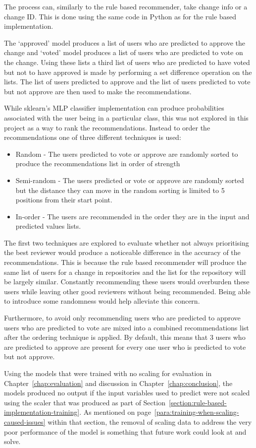 The process can, similarly to the rule based recommender, take change info or a change ID. This is done using the same code in Python as for the rule based implementation.

The `approved' model produces a list of users who are predicted to approve the change and `voted' model produces a list of users who are predicted to vote on the change. Using these lists a third list of users who are predicted to have voted but not to have approved is made by performing a set difference operation on the lists. The list of users predicted to approve and the list of users predicted to vote but not approve are then used to make the recommendations.

While sklearn's MLP classifier implementation can produce probabilities associated with the user being in a particular class, this was not explored in this project as a way to rank the recommendations. \label{para:selection-mode-neural-network}Instead to order the recommendations one of three different techniques is used:
\begin{itemize}
    \item Random - The users predicted to vote or approve are randomly sorted to produce the recommendations list in order of strength
    \item Semi-random - The users predicted or vote or approve are randomly sorted but the distance they can move in the random sorting is limited to 5 positions from their start point.
    \item In-order - The users are recommended in the order they are in the input and predicted values lists.
\end{itemize}

The first two techniques are explored to evaluate whether not always prioritising the best reviewer would produce a noticeable difference in the accuracy of the recommendations. This is because the rule based recommender will produce the same list of users for a change in repositories and the list for the repository will be largely similar. Constantly recommending these users would overburden these users while leaving other good reviewers without being recommended. Being able to introduce some randomness would help alleviate this concern.

\label{para:mixing-approvers-and-voters}Furthermore, to avoid only recommending users who are predicted to approve users who are predicted to vote are mixed into a combined recommendations list after the ordering technique is applied. By default, this means that 3 users who are predicted to approve are present for every one user who is predicted to vote but not approve.

Using the models that were trained with no scaling for evaluation in Chapter~\ref{chap:evaluation} and discussion in Chapter~\ref{chap:conclusion}, the models produced no output if the input variables used to predict were not scaled using the scaler that was produced as part of Section~\ref{section:rule-based-implementation-training}. As mentioned on page~\ref{para:training-when-scaling-caused-issues} within that section, the removal of scaling data to address the very poor performance of the model is something that future work could look at and solve.